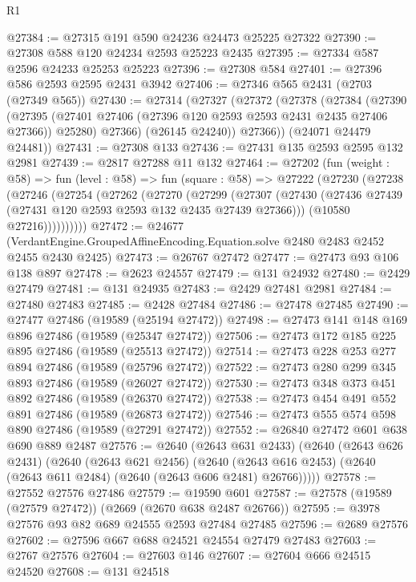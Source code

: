 \begin{lexlean}{R1}
\begin{coremodule}
@27384 := @27315 @191 @590 @24236 @24473 @25225 @27322
@27390 := @27308 @588 @120 @24234 @2593 @25223 @2435
@27395 := @27334 @587 @2596 @24233 @25253 @25223
@27396 := @27308 @584
@27401 := @27396 @586 @2593 @2595 @2431 @3942
@27406 := @27346 @565 @2431 (@2703 (@27349 @565))
@27430 := @27314
    (@27327
      (@27372
        (@27378
          (@27384
            (@27390
              (@27395 (@27401 @27406 (@27396 @120 @2593 @2593 @2431 @2435 @27406 @27366)) @25280)
              @27366)
            (@26145 @24240))
          @27366))
      (@24071 @24479 @24481))
@27431 := @27308 @133
@27436 := @27431 @135 @2593 @2595 @132 @2981
@27439 := @2817 @27288 @11 @132
@27464 := @27202
    (fun (weight : @58) =>
    fun (level : @58) =>
    fun (square : @58) =>
    @27222
      (@27230
        (@27238
          (@27246
            (@27254
              (@27262
                (@27270
                  (@27299
                    (@27307
                      (@27430 (@27436 @27439 (@27431 @120 @2593 @2593 @132 @2435 @27439 @27366)))
                      (@10580 @27216))))))))))
@27472 := @24677
    (VerdantEngine.GroupedAffineEncoding.Equation.solve @2480 @2483 @2452 @2455 @2430 @2425)
@27473 := @26767 @27472
@27477 := @27473 @93 @106 @138 @897
@27478 := @2623 @24557
@27479 := @131 @24932
@27480 := @2429 @27479
@27481 := @131 @24935
@27483 := @2429 @27481 @2981
@27484 := @27480 @27483
@27485 := @2428 @27484
@27486 := @27478 @27485
@27490 := @27477 @27486 (@19589 (@25194 @27472))
@27498 := @27473 @141 @148 @169 @896 @27486 (@19589 (@25347 @27472))
@27506 := @27473 @172 @185 @225 @895 @27486 (@19589 (@25513 @27472))
@27514 := @27473 @228 @253 @277 @894 @27486 (@19589 (@25796 @27472))
@27522 := @27473 @280 @299 @345 @893 @27486 (@19589 (@26027 @27472))
@27530 := @27473 @348 @373 @451 @892 @27486 (@19589 (@26370 @27472))
@27538 := @27473 @454 @491 @552 @891 @27486 (@19589 (@26873 @27472))
@27546 := @27473 @555 @574 @598 @890 @27486 (@19589 (@27291 @27472))
@27552 := @26840 @27472 @601 @638 @690 @889 @2487
@27576 := @2640
    (@2643 @631 @2433)
    (@2640
      (@2643 @626 @2431)
      (@2640
        (@2643 @621 @2456)
        (@2640 (@2643 @616 @2453) (@2640 (@2643 @611 @2484) (@2640 (@2643 @606 @2481) @26766)))))
@27578 := @27552 @27576 @27486
@27579 := @19590 @601
@27587 := @27578 (@19589 (@27579 @27472)) (@2669 (@2670 @638 @2487 @26766))
@27595 := @3978 @27576 @93 @82 @689 @24555 @2593 @27484 @27485
@27596 := @2689 @27576
@27602 := @27596 @667 @688 @24521 @24554 @27479 @27483
@27603 := @2767 @27576
@27604 := @27603 @146
@27607 := @27604 @666 @24515 @24520
@27608 := @131 @24518

\end{coremodule}
\end{lexlean}
